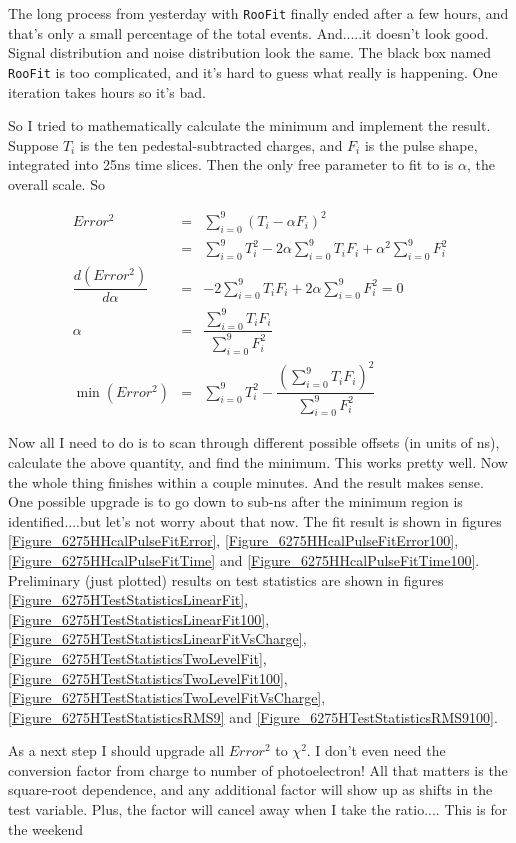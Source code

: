 The long process from yesterday with \texttt{RooFit} finally ended after a few hours, and that's only a small percentage of the total events.
And.....it doesn't look good.  Signal distribution and noise distribution look the same.  The black box named \texttt{RooFit} is too complicated,
and it's hard to guess what really is happening.  One iteration takes hours so it's bad.

So I tried to mathematically calculate the minimum and implement the result.  Suppose $T_i$ is the ten pedestal-subtracted charges, and
$F_i$ is the pulse shape, integrated into 25ns time slices.  Then the only free parameter to fit to is $\alpha$, the overall scale.  So

\begin{eqnarray}
Error^2 &=& \sum_{i=0}^{9} (T_i - \alpha F_i)^2\nonumber\\
   &=& \sum_{i=0}^{9} T_i^2 - 2 \alpha \sum_{i=0}^{9} T_i F_i + \alpha^2 \sum_{i=0}^{9} F_i^2\nonumber\\
\dfrac{d(Error^2)}{d\alpha} &=& -2\sum_{i=0}^{9} T_i F_i + 2\alpha \sum_{i=0}^{9} F_i^2 = 0\nonumber\\
\alpha &=& \dfrac{\displaystyle\sum_{i=0}^{9} T_i F_i}{\displaystyle\sum_{i=0}^{9} F_i^2}\nonumber\\
\min (Error^2) &=& \sum_{i=0}^{9} T_i^2 - \dfrac{\left(\displaystyle\sum_{i=0}^{9} T_i F_i\right)^2}{\displaystyle\sum_{i=0}^{9} F_i^2}\nonumber
\end{eqnarray}

Now all I need to do is to scan through different possible offsets (in units of ns), calculate the above quantity, and find the minimum.
This works pretty well.  Now the whole thing finishes within a couple minutes.  And the result makes sense.
One possible upgrade is to go down to sub-ns after the minimum region is identified....but let's not worry about that now.
The fit result is shown in figures \ref{Figure_6275HHcalPulseFitError}, \ref{Figure_6275HHcalPulseFitError100},
\ref{Figure_6275HHcalPulseFitTime} and \ref{Figure_6275HHcalPulseFitTime100}.
Preliminary (just plotted) results on test statistics are shown in figures
\ref{Figure_6275HTestStatisticsLinearFit}, \ref{Figure_6275HTestStatisticsLinearFit100}, \ref{Figure_6275HTestStatisticsLinearFitVsCharge},
\ref{Figure_6275HTestStatisticsTwoLevelFit}, \ref{Figure_6275HTestStatisticsTwoLevelFit100}, \ref{Figure_6275HTestStatisticsTwoLevelFitVsCharge},
\ref{Figure_6275HTestStatisticsRMS9} and \ref{Figure_6275HTestStatisticsRMS9100}.

As a next step I should upgrade all $Error^2$ to $\chi^2$.  I don't even need the conversion factor from charge to number of photoelectron!
All that matters is the square-root dependence, and any additional factor will show up as shifts in the test variable.  Plus, the factor will cancel away
when I take the ratio....  This is for the weekend\tweakedtilde

